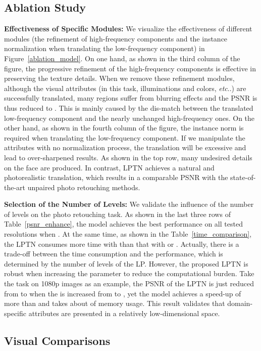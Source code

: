 \documentclass[10pt,twocolumn,letterpaper]{article}
\makeatletter
\DeclareRobustCommand\onedot{\futurelet\@let@token\@onedot}
\def\@onedot{\ifx\@let@token.\else.\null\fi\xspace}
\def\etc{\emph{etc}\onedot} \def\vs{\emph{vs}\onedot}
\makeatother
\begin{document}
	
	\subsection{Ablation Study}
	
	\noindent\textbf{Effectiveness of Specific Modules: } We visualize the effectiveness of different modules (the refinement of high-frequency components and the instance normalization when translating the low-frequency component) in Figure~\ref{ablation_model}. On one hand, as shown in the third column of the figure, the progressive refinement of the high-frequency components is effective in preserving the texture details. When we remove these refinement modules, although the visual attributes (in this task, illuminations and colors, \etc) are successfully translated, many regions suffer from blurring effects and the PSNR is thus reduced to . This is mainly caused by the dis-match between the translated low-frequency component and the nearly unchanged high-frequency ones. On the other hand, as shown in the fourth column of the figure, the instance norm is required when translating the low-frequency component. If we manipulate the attributes with no normalization process, the translation will be excessive and lead to over-sharpened results. As shown in the top row, many undesired details on the face are produced. In contrast, LPTN achieves a natural and photorealistic translation, which results in a comparable PSNR with the state-of-the-art unpaired photo retouching methods.
	
	\noindent\textbf{Selection of the Number of Levels: } We validate the influence of the number of levels  on the photo retouching task. As shown in the last three rows of Table~\ref{psnr_enhance}, the model achieves the best performance on all tested resolutions when . At the same time, as shown in the Table~\ref{time_comparison}, the LPTN consumes more time with  than that with  or . Actually, there is a trade-off between the time consumption and the performance, which is determined by the number of levels of the LP. However, the proposed LPTN is robust when increasing the parameter  to reduce the computational burden. Take the task on 1080p images as an example, the PSNR of the LPTN is just reduced from  to  when the  is increased from  to , yet the model achieves a speed-up of more than  and takes about  of memory usage. This result validates that domain-specific attributes are presented in a relatively low-dimensional space.
	
	\subsection{Visual Comparisons}
	\label{visual_comp}
	
\end{document}
